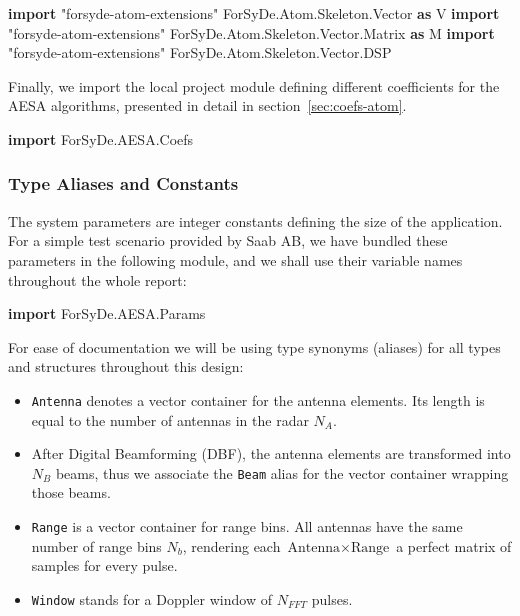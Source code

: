 \documentclass[
  a4paper,
]{article}
\newenvironment{Shaded}{}{}
\newcommand{\DataTypeTok}[1]{\textcolor[rgb]{0.56,0.13,0.00}{#1}}
\newcommand{\KeywordTok}[1]{\textcolor[rgb]{0.00,0.44,0.13}{\textbf{#1}}}
\newcommand{\NormalTok}[1]{#1}
\begin{document}
\begin{Shaded}
\begin{Highlighting}[numbers=left,,firstnumber=74,]
\KeywordTok{import}\NormalTok{ "forsyde-atom-extensions" }\DataTypeTok{ForSyDe.Atom.Skeleton.Vector}        \KeywordTok{as} \DataTypeTok{V}
\KeywordTok{import}\NormalTok{ "forsyde-atom-extensions" }\DataTypeTok{ForSyDe.Atom.Skeleton.Vector.Matrix} \KeywordTok{as} \DataTypeTok{M}
\KeywordTok{import}\NormalTok{ "forsyde-atom-extensions" }\DataTypeTok{ForSyDe.Atom.Skeleton.Vector.DSP}
\end{Highlighting}
\end{Shaded}

Finally, we import the local project module defining different
coefficients for the AESA algorithms, presented in detail in
section~\ref{sec:coefs-atom}.

\begin{Shaded}
\begin{Highlighting}[numbers=left,,firstnumber=81,]
\KeywordTok{import} \DataTypeTok{ForSyDe.AESA.Coefs}
\end{Highlighting}
\end{Shaded}

\hypertarget{sec:aliases-shallow}{%
\subsubsection{Type Aliases and Constants}\label{sec:aliases-shallow}}

The system parameters are integer constants defining the size of the
application. For a simple test scenario provided by Saab AB, we have
bundled these parameters in the following module, and we shall use their
variable names throughout the whole report:

\begin{Shaded}
\begin{Highlighting}[numbers=left,,firstnumber=89,]
\KeywordTok{import} \DataTypeTok{ForSyDe.AESA.Params}
\end{Highlighting}
\end{Shaded}

For ease of documentation we will be using type synonyms (aliases) for
all types and structures throughout this design:

\begin{itemize}
\item
  \texttt{Antenna} denotes a vector container for the antenna elements.
  Its length is equal to the number of antennas in the radar \(N_A\).
\item
  After Digital Beamforming (DBF), the antenna elements are transformed
  into \(N_B\) beams, thus we associate the \texttt{Beam} alias for the
  vector container wrapping those beams.
\item
  \texttt{Range} is a vector container for range bins. All antennas have
  the same number of range bins \(N_b\), rendering each
  \(\text{Antenna} \times \text{Range}\) a perfect matrix of samples for
  every pulse.
\item
  \texttt{Window} stands for a Doppler window of \(N_{FFT}\) pulses.
\end{itemize}
\end{document}

